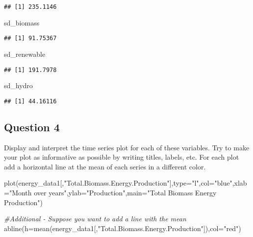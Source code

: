 \documentclass[
]{article}
\newenvironment{Shaded}{\begin{snugshade}}{\end{snugshade}}
\newcommand{\AttributeTok}[1]{\textcolor[rgb]{0.77,0.63,0.00}{#1}}
\newcommand{\CommentTok}[1]{\textcolor[rgb]{0.56,0.35,0.01}{\textit{#1}}}
\newcommand{\FunctionTok}[1]{\textcolor[rgb]{0.00,0.00,0.00}{#1}}
\newcommand{\NormalTok}[1]{#1}
\newcommand{\StringTok}[1]{\textcolor[rgb]{0.31,0.60,0.02}{#1}}
\begin{document}
\begin{verbatim}
## [1] 235.1146
\end{verbatim}

\begin{Shaded}
\begin{Highlighting}[]
\NormalTok{sd\_biomass}
\end{Highlighting}
\end{Shaded}

\begin{verbatim}
## [1] 91.75367
\end{verbatim}

\begin{Shaded}
\begin{Highlighting}[]
\NormalTok{sd\_renewable}
\end{Highlighting}
\end{Shaded}

\begin{verbatim}
## [1] 191.7978
\end{verbatim}

\begin{Shaded}
\begin{Highlighting}[]
\NormalTok{sd\_hydro}
\end{Highlighting}
\end{Shaded}

\begin{verbatim}
## [1] 44.16116
\end{verbatim}

\hypertarget{question-4}{%
\subsection{Question 4}\label{question-4}}

Display and interpret the time series plot for each of these variables.
Try to make your plot as informative as possible by writing titles,
labels, etc. For each plot add a horizontal line at the mean of each
series in a different color.

\begin{Shaded}
\begin{Highlighting}[]
\FunctionTok{plot}\NormalTok{(energy\_data1[,}\StringTok{"Total.Biomass.Energy.Production"}\NormalTok{],}\AttributeTok{type=}\StringTok{"l"}\NormalTok{,}\AttributeTok{col=}\StringTok{"blue"}\NormalTok{,}\AttributeTok{xlab=}\StringTok{"Month over years"}\NormalTok{,}\AttributeTok{ylab=}\StringTok{"Production"}\NormalTok{,}\AttributeTok{main=}\StringTok{"Total Biomass Energy Production"}\NormalTok{) }

\CommentTok{\#Additional {-} Suppose you want to add a line with the mean}
\FunctionTok{abline}\NormalTok{(}\AttributeTok{h=}\FunctionTok{mean}\NormalTok{(energy\_data1[,}\StringTok{"Total.Biomass.Energy.Production"}\NormalTok{]),}\AttributeTok{col=}\StringTok{"red"}\NormalTok{)}
\end{Highlighting}
\end{Shaded}
\end{document}
